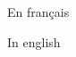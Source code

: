 \blankpage
\vfill

\begin{center}
\end{center}

{
\footnotesize

En français

}

\vspace{2cm}

\begin{center}
\end{center}

{
\footnotesize

In english

}

\vfill
